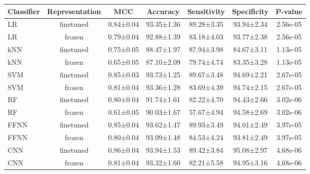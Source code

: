 \begin{tabular}{lcccccc}
\toprule
Classifier & Representation &       MCC &   Accuracy & Sensitivity & Specificity &  P-value \\
\midrule
        LR &      finetuned & 0.84±0.04 & 93.35±1.36 &  89.28±3.35 &  93.94±2.34 & 2.56e-05 \\
        LR &         frozen & 0.79±0.04 & 92.88±1.39 &  83.18±4.03 &  93.77±2.38 & 2.56e-05 \\
        kNN &      finetuned & 0.75±0.05 & 88.47±1.97 &  87.94±3.98 &  84.67±3.11 & 1.13e-05 \\
        kNN &         frozen & 0.65±0.05 & 87.10±2.09 &  79.74±4.74 &  83.35±3.28 & 1.13e-05 \\
        SVM &      finetuned & 0.85±0.03 & 93.73±1.25 &  89.67±3.48 &  94.69±2.21 & 2.67e-05 \\
        SVM &         frozen & 0.81±0.04 & 93.36±1.28 &  83.69±4.39 &  94.74±2.15 & 2.67e-05 \\
        RF &      finetuned & 0.80±0.04 & 91.74±1.61 &  82.22±4.70 &  94.43±2.66 & 3.02e-06 \\
        RF &         frozen & 0.61±0.05 & 90.03±1.67 &  57.67±4.94 &  94.58±2.69 & 3.02e-06 \\
       FFNN &      finetuned & 0.85±0.04 & 93.62±1.47 &  89.93±3.49 &  94.01±2.49 & 3.97e-05 \\
       FFNN &         frozen & 0.80±0.04 & 93.09±1.48 &  84.53±4.24 &  93.81±2.49 & 3.97e-05 \\
       CNN &      finetuned & 0.86±0.04 & 93.94±1.53 &  89.42±3.84 &  95.08±2.97 & 4.68e-06 \\
       CNN &         frozen & 0.81±0.04 & 93.32±1.60 &  82.21±5.58 &  94.95±3.16 & 4.68e-06 \\
\bottomrule
\end{tabular}
